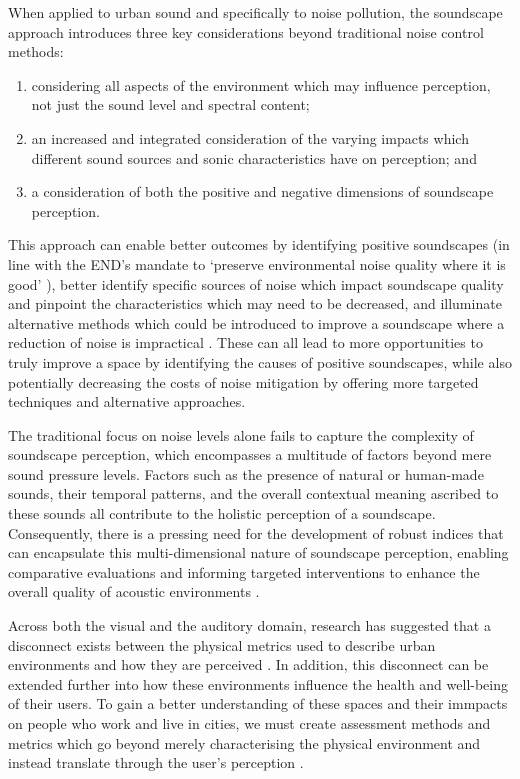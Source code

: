 \documentclass[
  authoryear,
  preprint,
  3p]{elsarticle}
\providecommand{\tightlist}{%
  \setlength{\itemsep}{0pt}\setlength{\parskip}{0pt}}\usepackage{longtable,booktabs,array}
\begin{document}
When applied to urban sound and specifically to noise pollution, the
soundscape approach introduces three key considerations beyond
traditional noise control methods:

\begin{enumerate}
\def\labelenumi{\arabic{enumi}.}
\tightlist
\item
  considering all aspects of the environment which may influence
  perception, not just the sound level and spectral content;
\item
  an increased and integrated consideration of the varying impacts which
  different sound sources and sonic characteristics have on perception;
  and
\item
  a consideration of both the positive and negative dimensions of
  soundscape perception.
\end{enumerate}

This approach can enable better outcomes by identifying positive
soundscapes (in line with the END's mandate to `preserve environmental
noise quality where it is good' \citep{EuropeanUnion2002Directive}),
better identify specific sources of noise which impact soundscape
quality and pinpoint the characteristics which may need to be decreased,
and illuminate alternative methods which could be introduced to improve
a soundscape where a reduction of noise is impractical
\citep{Fiebig2018Does, Kang2018Impact}. These can all lead to more
opportunities to truly improve a space by identifying the causes of
positive soundscapes, while also potentially decreasing the costs of
noise mitigation by offering more targeted techniques and alternative
approaches.

The traditional focus on noise levels alone fails to capture the
complexity of soundscape perception, which encompasses a multitude of
factors beyond mere sound pressure levels. Factors such as the presence
of natural or human-made sounds, their temporal patterns, and the
overall contextual meaning ascribed to these sounds all contribute to
the holistic perception of a soundscape. Consequently, there is a
pressing need for the development of robust indices that can encapsulate
this multi-dimensional nature of soundscape perception, enabling
comparative evaluations and informing targeted interventions to enhance
the overall quality of acoustic environments \citep{Chen2023Developing}.

Across both the visual and the auditory domain, research has suggested
that a disconnect exists between the physical metrics used to describe
urban environments and how they are perceived
\citep{Kruize2019Exploring, Yang2005Acoustic}. In addition, this
disconnect can be extended further into how these environments influence
the health and well-being of their users. To gain a better understanding
of these spaces and their immpacts on people who work and live in
cities, we must create assessment methods and metrics which go beyond
merely characterising the physical environment and instead translate
through the user's perception \citep{Mitchell2022Predictive}.
\end{document}
